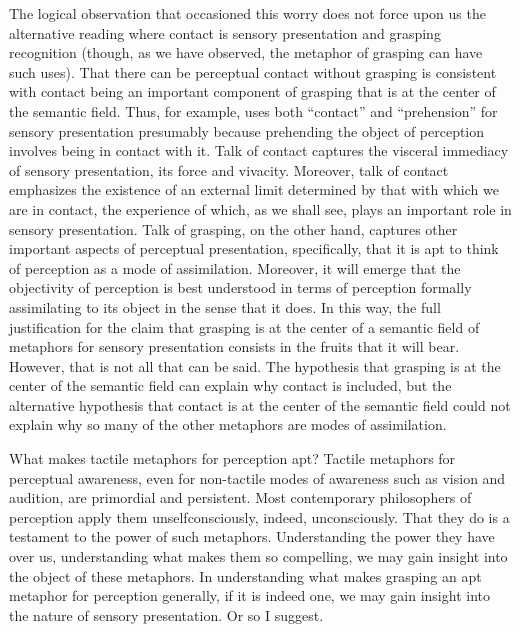 The logical observation that occasioned this worry does not force upon us the alternative reading where contact is sensory presentation and grasping recognition (though, as we have observed, the metaphor of grasping can have such uses). That there can be perceptual contact without grasping is consistent with contact being an important component of grasping that is at the center of the semantic field. Thus, for example, \citet{Broad:1952kx} uses both ``contact'' and ``prehension'' for sensory presentation presumably because prehending the object of perception involves being in contact with it. Talk of contact captures the visceral immediacy of sensory presentation, its force and vivacity. Moreover, talk of contact emphasizes the existence of an external limit determined by that with which we are in contact, the experience of which, as we shall see, plays an important role in sensory presentation. Talk of grasping, on the other hand, captures other important aspects of perceptual presentation, specifically, that it is apt to think of perception as a mode of assimilation. Moreover, it will emerge that the objectivity of perception is best understood in terms of perception formally assimilating to its object in the sense that it does. In this way, the full justification for the claim that grasping is at the center of a semantic field of metaphors for sensory presentation consists in the fruits that it will bear. However, that is not all that can be said. The hypothesis that grasping is at the center of the semantic field can explain why contact is included, but the alternative hypothesis that contact is at the center of the semantic field could not explain why so many of the other metaphors are modes of assimilation.

What makes tactile metaphors for perception apt? Tactile metaphors for perceptual awareness, even for non-tactile modes of awareness such as vision and audition, are primordial and persistent. Most contemporary philosophers of perception apply them unselfconsciously, indeed, unconsciously. That they do is a testament to the power of such metaphors. Understanding the power they have over us, understanding what makes them so compelling, we may gain insight into the object of these metaphors. In understanding what makes grasping an apt metaphor for perception generally, if it is indeed one, we may gain insight into the nature of sensory presentation. Or so I suggest.

